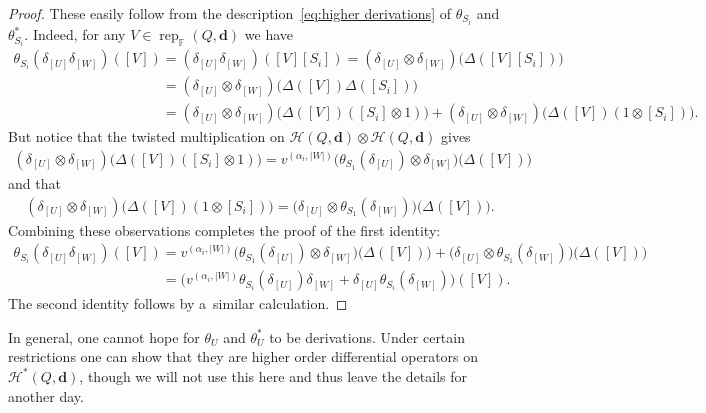 \documentclass[pdftex]{sigma}
\numberwithin{equation}{section}
\begin{document}
\begin{proof}
These easily follow from the description~\eqref{eq:higher derivations} of $\theta_{S_i}$ and $\theta_{S_i}^*$.
Indeed, for any $V\in\operatorname{rep}_\mathbb{F}(Q,\mathbf{d})$ we have
\begin{gather*}
\theta_{S_i}(\delta_{[U]}\delta_{[W]})([V])
 =(\delta_{[U]}\delta_{[W]})([V][S_i])=(\delta_{[U]}\otimes\delta_{[W]})\big(\Delta([V][S_i])\big)
\\
\phantom{\theta_{S_i}(\delta_{[U]}\delta_{[W]})([V])}
 =(\delta_{[U]}\otimes\delta_{[W]})\big(\Delta([V])\Delta([S_i])\big)
\\
\phantom{\theta_{S_i}(\delta_{[U]}\delta_{[W]})([V])}
 =(\delta_{[U]}\otimes\delta_{[W]})\big(\Delta([V])([S_i]\otimes1)\big)+(\delta_{[U]}\otimes\delta_{[W]})\big(\Delta([V])(1\otimes[S_i])\big).
\end{gather*}
But notice that the twisted multiplication on $\mathcal{H}(Q,\mathbf{d})\otimes\mathcal{H}(Q,\mathbf{d})$ gives
\begin{gather*}
(\delta_{[U]}\otimes\delta_{[W]})\big(\Delta([V])([S_i]\otimes1)\big)
=v^{(\alpha_i,|W|)}\big(\theta_{S_1}(\delta_{[U]})\otimes\delta_{[W]}\big)\big(\Delta([V])\big)
\end{gather*}
and that
\begin{gather*}
(\delta_{[U]}\otimes\delta_{[W]})\big(\Delta([V])(1\otimes[S_i])\big)=\big(\delta_{[U]}\otimes\theta_{S_1}(\delta_{[W]})\big)\big(\Delta([V])\big).
\end{gather*}
Combining these observations completes the proof of the f\/irst identity:
\begin{gather*}
\theta_{S_i}(\delta_{[U]}\delta_{[W]})([V])=v^{(\alpha_i,|W|)}\big(\theta_{S_1}(\delta_{[U]})\otimes\delta_{[W]}\big)\big(\Delta([V])\big)
+\big(\delta_{[U]}\otimes\theta_{S_1}(\delta_{[W]})\big)\big(\Delta([V])\big)
\\
\phantom{\theta_{S_i}(\delta_{[U]}\delta_{[W]})([V])}
 =\big(v^{(\alpha_i,|W|)}\theta_{S_i}(\delta_{[U]})\delta_{[W]}+\delta_{[U]}\theta_{S_i}(\delta_{[W]})\big)([V]).
\end{gather*}
The second identity follows by a~similar calculation.
\end{proof}

\begin{Remark}
In general, one cannot hope for $\theta_U$ and $\theta_U^*$ to be derivations.
Under certain restrictions one can show that they are higher order dif\/ferential operators on
$\mathcal{H}^*(Q,\mathbf{d})$, though we will not use this here and thus leave the details for another day.
\end{Remark}
\end{document}
